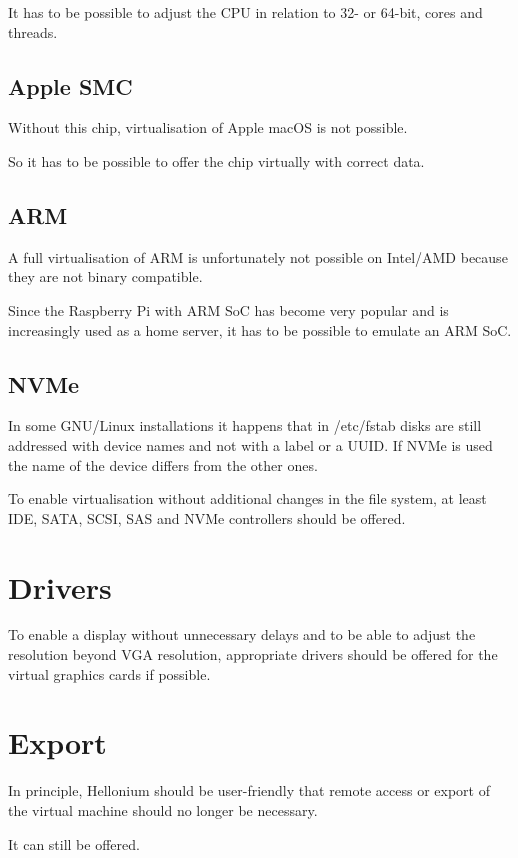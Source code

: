 It has to be possible to adjust the CPU in relation to 32- or 64-bit, cores and threads.

\subsection{Apple SMC}

Without this chip, virtualisation of Apple macOS is not possible.

So it has to be possible to offer the chip virtually with correct data.

\subsection{ARM}

A full virtualisation of ARM is unfortunately not possible on Intel/AMD because they are not binary compatible.

Since the Raspberry Pi with ARM SoC has become very popular and is increasingly used as a home server, it has to be possible to emulate an ARM SoC.

\subsection{NVMe}

In some GNU/Linux installations it happens that in /etc/fstab disks are still addressed with device names and not with a label or a UUID. If NVMe is used the name of the device differs from the other ones.

To enable virtualisation without additional changes in the file system, at least IDE, SATA, SCSI, SAS and NVMe controllers should be offered.

\section{Drivers}
\label{sec:drivers}

To enable a display without unnecessary delays and to be able to adjust the resolution beyond VGA resolution, appropriate drivers should be offered for the virtual graphics cards if possible.

\section{Export}
\label{sec:export}

In principle, Hellonium should be user-friendly that remote access or export of the virtual machine should no longer be necessary.

It can still be offered.
